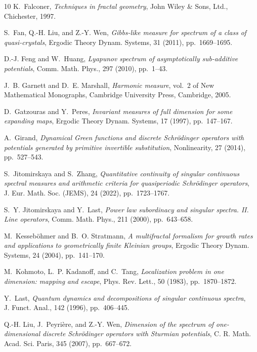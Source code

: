 \documentclass[reqno,11pt,graphicx,]{amsart}
\numberwithin{equation}{section}
\theoremstyle{plain}
\newcommand{\3}{\mathbf{3}}
\begin{document}
\begin{thebibliography}{10}
{\sc K.~Falconer}, {\em Techniques in fractal geometry}, John Wiley \& Sons,
  Ltd., Chichester, 1997.

{\sc S.~Fan, Q.-H. Liu, and Z.-Y. Wen}, {\em Gibbs-like measure for spectrum of
  a class of quasi-crystals}, Ergodic Theory Dynam. Systems, 31 (2011),
  pp.~1669--1695.

{\sc D.-J. Feng and W.~Huang}, {\em Lyapunov spectrum of asymptotically
  sub-additive potentials}, Comm. Math. Phys., 297 (2010), pp.~1--43.

{\sc J.~B. Garnett and D.~E. Marshall}, {\em Harmonic measure}, vol.~2 of New
  Mathematical Monographs, Cambridge University Press, Cambridge, 2005.

{\sc D.~Gatzouras and Y.~Peres}, {\em Invariant measures of full dimension for
  some expanding maps}, Ergodic Theory Dynam. Systems, 17 (1997), pp.~147--167.

{\sc A.~Girand}, {\em Dynamical {G}reen functions and discrete {S}chr\"odinger
  operators with potentials generated by primitive invertible substitution},
  Nonlinearity, 27 (2014), pp.~527--543.

{\sc S.~Jitomirskaya and S.~Zhang}, {\em Quantitative continuity of singular
  continuous spectral measures and arithmetic criteria for quasiperiodic
  {S}chr\"odinger operators}, J. Eur. Math. Soc. (JEMS), 24 (2022),
  pp.~1723--1767.

{\sc S.~Y. Jitomirskaya and Y.~Last}, {\em Power law subordinacy and singular
  spectra. {II}. {L}ine operators}, Comm. Math. Phys., 211 (2000),
  pp.~643--658.

{\sc M.~Kesseb\"ohmer and B.~O. Stratmann}, {\em A multifractal formalism for
  growth rates and applications to geometrically finite {K}leinian groups},
  Ergodic Theory Dynam. Systems, 24 (2004), pp.~141--170.

{\sc M.~Kohmoto, L.~P. Kadanoff, and C.~Tang}, {\em Localization problem in one
  dimension: mapping and escape}, Phys. Rev. Lett., 50 (1983), pp.~1870--1872.

{\sc Y.~Last}, {\em Quantum dynamics and decompositions of singular continuous
  spectra}, J. Funct. Anal., 142 (1996), pp.~406--445.

{\sc Q.-H. Liu, J.~Peyri\`ere, and Z.-Y. Wen}, {\em Dimension of the spectrum
  of one-dimensional discrete {S}chr\"odinger operators with {S}turmian
  potentials}, C. R. Math. Acad. Sci. Paris, 345 (2007), pp.~667--672.


\end{thebibliography}
\end{document}

